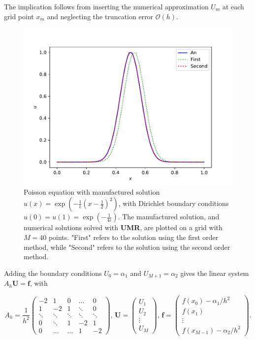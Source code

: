 \noindent The implication follows from inserting the numerical approximation $U_m$ at each grid point $x_m$ and neglecting the truncation error $\mathcal{O}(h)$. 
\begin{figure}[t]
\centering
\includegraphics[width=0.85\linewidth]{plots/solutionTask1dUMR.pdf}
\caption{Poisson equation with manufactured solution $u(x) = \exp{\left(-\frac{1}{\epsilon}(x-\frac{1}{2})^2\right)}$, with Dirichlet boundary conditions $u(0) = u(1) = \exp{\left(-\frac{1}{4\epsilon}\right)}$. The manufactured solution, and numerical solutions solved with \textbf{UMR}, are plotted on a grid with $M = 40$ points. "First" refers to the solution using the first order method, while "Second" refers to the solution using the second order method.}
\label{fig:part1Task1dSolutionUMR}
\end{figure}
Adding the boundary conditions $U_0 = \alpha_1$ and $U_{M+1} = \alpha_2$ gives the linear system $A_h\boldsymbol{U} = \boldsymbol{f}$, with 

\begin{equation*}
    A_h = \frac{1}{h^2}\begin{pmatrix} 
    -2 & 1 & 0 & \dots & 0 \\
    1 & -2 & 1 & \ddots & 0 \\
    \ddots & \ddots & \ddots & \ddots & \ddots \\
    0 & \ddots & 1 & -2 & 1 \\
    0 & \dots & \dots & 1 & -2
    \end{pmatrix}, \, 
    \boldsymbol{U} = \begin{pmatrix}
    U_1 \\
    U_2 \\
    \vdots \\
    U_M 
    \end{pmatrix}, \, \boldsymbol{f} = \begin{pmatrix}
    f(x_0) - \alpha_1/h^2 \\
    f(x_1) \\
    \vdots \\
    f(x_{M-1}) - \alpha_2/h^2
    \end{pmatrix}.
\end{equation*}

